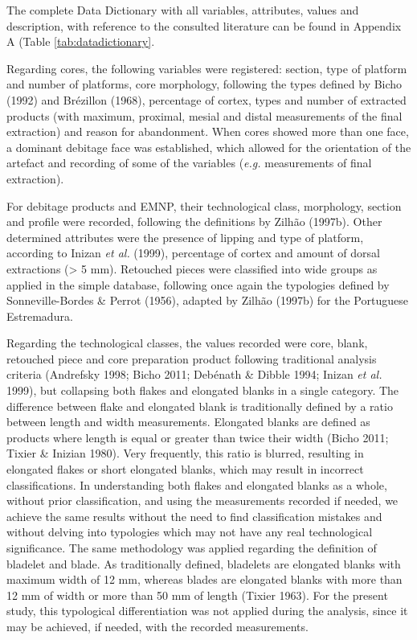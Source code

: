 \documentclass[12pt,twoside]{reedthesis}
\begin{document}
The complete Data Dictionary with all variables, attributes, values and description, with reference to the consulted literature can be found in Appendix A (Table \ref{tab:datadictionary}.

Regarding cores, the following variables were registered: section, type of platform and number of platforms, core morphology, following the types defined by Bicho (1992) and Brézillon (1968), percentage of cortex, types and number of extracted products (with maximum, proximal, mesial and distal measurements of the final extraction) and reason for abandonment. When cores showed more than one face, a dominant debitage face was established, which allowed for the orientation of the artefact and recording of some of the variables (\emph{e.g.} measurements of final extraction).

For debitage products and EMNP, their technological class, morphology, section and profile were recorded, following the definitions by Zilhão (1997b). Other determined attributes were the presence of lipping and type of platform, according to Inizan \emph{et al.} (1999), percentage of cortex and amount of dorsal extractions (\textgreater{} 5 mm). Retouched pieces were classified into wide groups as applied in the simple database, following once again the typologies defined by Sonneville-Bordes \& Perrot (1956), adapted by Zilhão (1997b) for the Portuguese Estremadura.

Regarding the technological classes, the values recorded were core, blank, retouched piece and core preparation product following traditional analysis criteria (Andrefsky 1998; Bicho 2011; Debénath \& Dibble 1994; Inizan \emph{et al.} 1999), but collapsing both flakes and elongated blanks in a single category. The difference between flake and elongated blank is traditionally defined by a ratio between length and width measurements. Elongated blanks are defined as products where length is equal or greater than twice their width (Bicho 2011; Tixier \& Inizian 1980). Very frequently, this ratio is blurred, resulting in elongated flakes or short elongated blanks, which may result in incorrect classifications. In understanding both flakes and elongated blanks as a whole, without prior classification, and using the measurements recorded if needed, we achieve the same results without the need to find classification mistakes and without delving into typologies which may not have any real technological significance. The same methodology was applied regarding the definition of bladelet and blade. As traditionally defined, bladelets are elongated blanks with maximum width of 12 mm, whereas blades are elongated blanks with more than 12 mm of width or more than 50 mm of length (Tixier 1963). For the present study, this typological differentiation was not applied during the analysis, since it may be achieved, if needed, with the recorded measurements.
\end{document}
